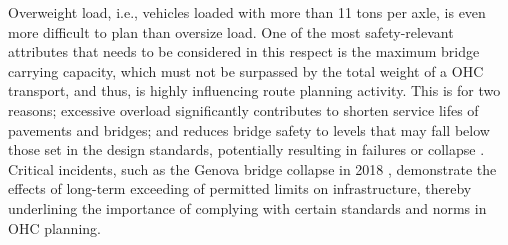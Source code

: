 Overweight load, i.e., vehicles loaded with more than 11 tons per axle, is even more difficult to plan than oversize load.
One of the most safety-relevant attributes that needs to be considered in this respect is the maximum bridge carrying capacity, which must not be surpassed by the total weight of a OHC transport, and thus, is highly influencing route planning activity.
This is for two reasons; excessive overload significantly contributes to shorten service lifes of pavements and bridges; and reduces bridge safety to levels that may fall below those set in the design standards, potentially resulting in failures or collapse \cite{fiorillo2018fragility}.
Critical incidents, such as the Genova bridge collapse in 2018 \cite{Morgese.2020, MorandiNYTimes},  demonstrate the effects of long-term exceeding of permitted limits on infrastructure, thereby underlining the importance of complying with certain standards and norms in OHC planning.

